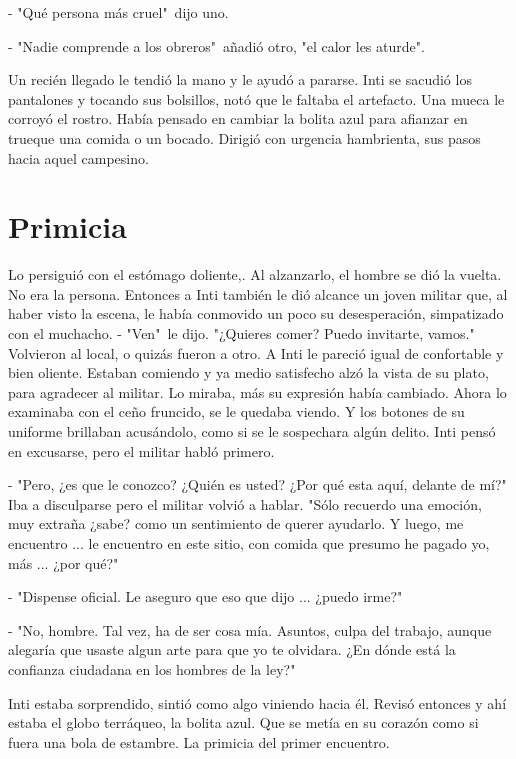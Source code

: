 - "Qué persona más cruel"\, dijo uno.

- "Nadie comprende a los obreros"\, añadió otro, "el calor les aturde".

Un recién llegado le tendió la mano y le ayudó a pararse. Inti se sacudió los pantalones y tocando sus bolsillos, notó que le faltaba el artefacto. Una mueca le corroyó el rostro. Había pensado en cambiar la bolita azul para afianzar en trueque una comida o un bocado. Dirigió con urgencia hambrienta, sus pasos hacia aquel campesino.



\chapter{Primicia}
Lo persiguió con el estómago doliente,. Al alzanzarlo, el hombre se dió la vuelta. No era la persona. Entonces a Inti también le dió alcance un joven militar que, al haber visto la escena, le había conmovido un poco su desesperación, simpatizado con el muchacho.
- "Ven"\, le dijo. "¿Quieres comer? Puedo invitarte, vamos."\, Volvieron al local, o quizás fueron a otro. A Inti le pareció igual de confortable y bien oliente. Estaban comiendo y ya medio satisfecho alzó la vista de su plato, para agradecer al militar. Lo miraba, más su expresión había cambiado. Ahora lo examinaba con el ceño fruncido, se le quedaba viendo. Y los botones de su uniforme brillaban acusándolo, como si se le sospechara algún delito. Inti pensó en excusarse, pero el militar habló primero.

- "Pero, ¿es que le conozco? ¿Quién es usted? ¿Por qué esta aquí, delante de mí?"\, Iba a disculparse pero el militar volvió a hablar. "Sólo recuerdo una emoción, muy extraña ¿sabe? como un sentimiento de querer ayudarlo. Y luego, me encuentro ... le encuentro en este sitio, con comida que presumo he pagado yo, más ... ¿por qué?"

- "Dispense oficial. Le aseguro que eso que dijo ... ¿puedo irme?"

- "No, hombre. Tal vez, ha de ser cosa mía. Asuntos, culpa del trabajo, aunque alegaría que usaste algun arte para que yo te olvidara. ¿En dónde está la confianza ciudadana en los hombres de la ley?"

Inti estaba sorprendido, sintió como algo viniendo hacia él. Revisó entonces y ahí estaba el globo terráqueo, la bolita azul. Que se metía en su corazón como si fuera una bola de estambre. La primicia del primer encuentro.


